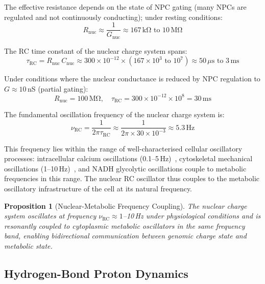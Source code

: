 \documentclass[12pt,a4paper]{article}
\newtheorem{proposition}[theorem]{Proposition}
\theoremstyle{definition}
\theoremstyle{remark}
\newcommand{\tauRC}{\tau_{\mathrm{RC}}}
\newcommand{\nuRC}{\nu_{\mathrm{RC}}}
\begin{document}
The effective resistance depends on the state of NPC gating (many NPCs are regulated and not continuously conducting); under resting conditions:
\begin{equation}
  R_{\mathrm{nuc}} \approx \frac{1}{G_{\mathrm{nuc}}} \approx 167\,\mathrm{k\Omega} \text{ to } 10\,\mathrm{M\Omega}
\end{equation}

The RC time constant of the nuclear charge system spans:
\begin{equation}
  \tauRC = R_{\mathrm{nuc}} \, C_{\mathrm{nuc}} \approx 300 \times 10^{-12} \times (167 \times 10^{3} \text{ to } 10^7) \approx 50\,\mu\mathrm{s} \text{ to } 3\,\mathrm{ms}
  \label{eq:tau_RC}
\end{equation}

Under conditions where the nuclear conductance is reduced by NPC regulation to $G \approx 10$\,nS (partial gating):
\begin{equation}
  R_{\mathrm{nuc}} = 100\,\mathrm{M\Omega}, \quad \tauRC = 300 \times 10^{-12} \times 10^8 = 30\,\mathrm{ms}
\end{equation}

The fundamental oscillation frequency of the nuclear charge system is:
\begin{equation}
  \nuRC = \frac{1}{2\pi \tauRC} \approx \frac{1}{2\pi \times 30 \times 10^{-3}} \approx 5.3\,\mathrm{Hz}
  \label{eq:nu_RC}
\end{equation}

This frequency lies within the range of well-characterised cellular oscillatory processes: intracellular calcium oscillations (0.1--5\,Hz)~\cite{Berridge1997}, cytoskeletal mechanical oscillations (1--10\,Hz)~\cite{Frey2006}, and NADH glycolytic oscillations couple to metabolic frequencies in this range. The nuclear RC oscillator thus couples to the metabolic oscillatory infrastructure of the cell at its natural frequency.

\begin{proposition}[Nuclear-Metabolic Frequency Coupling]
The nuclear charge system oscillates at frequency $\nuRC \approx 1$--10\,Hz under physiological conditions and is resonantly coupled to cytoplasmic metabolic oscillators in the same frequency band, enabling bidirectional communication between genomic charge state and metabolic state.
\label{prop:coupling}
\end{proposition}

\subsection{Hydrogen-Bond Proton Dynamics}
\end{document}
